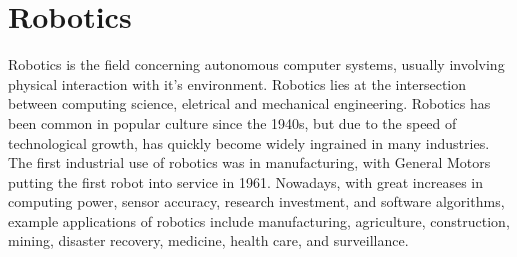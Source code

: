 \documentclass[../dissertation.tex]{subfiles}
\begin{document}
\section{Robotics}
\label{background-robotics}






Robotics is the field concerning autonomous computer systems, usually involving physical interaction with it's environment. Robotics lies at the intersection between computing science, eletrical and mechanical engineering. Robotics has been common in popular culture since the 1940s\cite{hockstein2007history}, but due to the speed of technological growth, has quickly become widely ingrained in many industries. The first industrial use of robotics was in manufacturing, with General Motors putting the first robot into service in 1961\cite{hagele2016ashorthistory}. Nowadays, with great increases in computing power, sensor accuracy, research investment, and software algorithms, example applications of robotics include manufacturing, agriculture, construction, mining, disaster recovery, medicine, health care, and surveillance\cite{hagele2016robotsatwork}.
\end{document}
